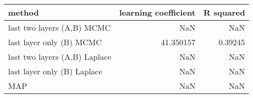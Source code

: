 \begin{tabular}{lrr}
\toprule
                        method &  learning coefficient &  R squared \\
\midrule
    last two layers (A,B) MCMC &                   NaN &        NaN \\
      last layer only (B) MCMC &             41.350157 &    0.39245 \\
 last two layers (A,B) Laplace &                   NaN &        NaN \\
   last layer only (B) Laplace &                   NaN &        NaN \\
                           MAP &                   NaN &        NaN \\
\bottomrule
\end{tabular}
